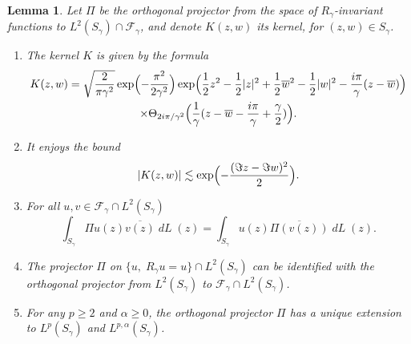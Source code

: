 \documentclass[JEP,XML,SOM,Unicode,NoFloatCountersInSection,published]{cedram}
\DeclareMathOperator{\dL}{\mathit{dL}}
\newtheorem{lemme}[theorem]{Lemma}
\theoremstyle{definition}
\let\EE\exp
\let\ov\overline
\begin{document}

\begin{lemme}\label{lemme_extension} Let $\Pi$ be the orthogonal projector from the space of $R_\gamma$-invariant functions to ${L^2(S_\gamma) \cap \mathcal{F}_{\gamma}}$, and denote $K(z,w)$ its kernel, for $(z,w) \in S_\gamma$.
\begin{enumerate}
\item\label{lemme_extensioni} The kernel $K$ is given by the formula
\begin{multline}\label{perio}
K(z,w)=\sqrt{\frac{2}{\pi \gamma^2}} \EE\Bigl({-\frac{\pi^2}{2\gamma^2}} \Bigr)\EE\Bigl({\frac{1}{2} z^2 - \frac{1}{2} |z|^2+\frac{1}{2} \ov{w}^2 - \frac{1}{2} |w|^2 -\frac{i\pi}{\gamma} (z- \ov{w})}\Bigr)\\
\times \Theta_{{2i\pi}/{\gamma^2}}\Bigl(\frac{1}{\gamma}(z-\ov{w}-\frac{i\pi}{\gamma}+\frac{\gamma}{2})\Bigr).
\end{multline}
\item\label{lemme_extensionii} It enjoys the bound
\begin{equation}\label{borneK}
|K(z, w)| \lesssim \EE\Bigl(-\frac{(\Im z-\Im w)^2}2\Bigr).
\end{equation}
\item\label{lemme_extensioniii} For all $u,v\in \mathcal{F}_{\gamma} \cap L^2(S_{\gamma})$
\begin{equation}\label{aa}
\int_{S_{\gamma}} \Pi u(z) \ov{v(z)}\dL(z)= \int_{S_{\gamma}} u(z) \ov{\Pi(v(z))}\dL(z).
\end{equation}
\item\label{lemme_extensioniv} The projector $\Pi$ on $\{ u, \; R_\gamma u = u \} \cap L^2(S_\gamma)$ can be identified with the orthogonal projector from $L^2(S_\gamma)$ to $\mathcal{F}_\gamma \cap L^2(S_\gamma)$.
\item\label{lemme_extensionv} For any $p \geq 2$ and $\alpha \geq 0$, the orthogonal projector $\Pi$ has a unique extension to $L^p(S_\gamma)$ and $L^{p,\alpha}(S_\gamma)$.
\end{enumerate}
\end{lemme}
\end{document}
